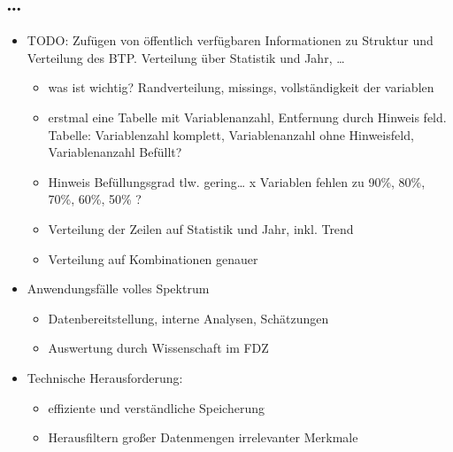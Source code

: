 \documentclass[
  german,
  10pt,
  twoside]{article}
\providecommand{\tightlist}{%
  \setlength{\itemsep}{0pt}\setlength{\parskip}{0pt}}
\begin{document}
\subsection{\ldots{}}\label{section}

\begin{itemize}
\tightlist
\item
  TODO: Zufügen von öffentlich verfügbaren Informationen zu Struktur und
  Verteilung des BTP. Verteilung über Statistik und Jahr, \ldots{}

  \begin{itemize}
  \tightlist
  \item
    was ist wichtig? Randverteilung, missings, vollständigkeit der
    variablen
  \item
    erstmal eine Tabelle mit Variablenanzahl, Entfernung durch Hinweis
    feld. Tabelle: Variablenzahl komplett, Variablenanzahl ohne
    Hinweisfeld, Variablenanzahl Befüllt?
  \item
    Hinweis Befüllungsgrad tlw. gering\ldots{} x Variablen fehlen zu
    90\%, 80\%, 70\%, 60\%, 50\% ?
  \item
    Verteilung der Zeilen auf Statistik und Jahr, inkl. Trend
  \item
    Verteilung auf Kombinationen genauer
  \end{itemize}
\item
  Anwendungsfälle volles Spektrum

  \begin{itemize}
  \tightlist
  \item
    Datenbereitstellung, interne Analysen, Schätzungen
  \item
    Auswertung durch Wissenschaft im FDZ
  \end{itemize}
\item
  Technische Herausforderung:

  \begin{itemize}
  \tightlist
  \item
    effiziente und verständliche Speicherung
  \item
    Herausfiltern großer Datenmengen irrelevanter Merkmale
  \end{itemize}
\end{itemize}


\printbibliography
\end{document}
